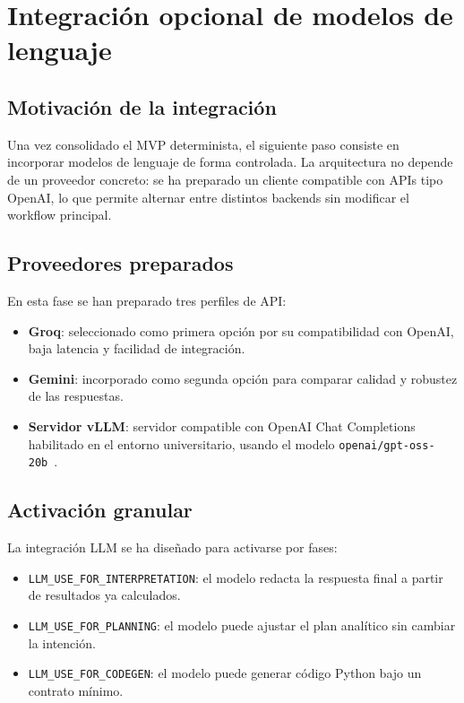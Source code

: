 \chapter{Integración opcional de modelos de lenguaje}

\section{Motivación de la integración}

Una vez consolidado el MVP determinista, el siguiente paso consiste en incorporar modelos de lenguaje de forma controlada. La arquitectura no depende de un proveedor concreto: se ha preparado un cliente compatible con APIs tipo OpenAI, lo que permite alternar entre distintos backends sin modificar el workflow principal.

\section{Proveedores preparados}

En esta fase se han preparado tres perfiles de API:

\begin{itemize}
    \item \textbf{Groq}: seleccionado como primera opción por su compatibilidad con OpenAI, baja latencia y facilidad de integración.
    \item \textbf{Gemini}: incorporado como segunda opción para comparar calidad y robustez de las respuestas.
    \item \textbf{Servidor vLLM}: servidor compatible con OpenAI Chat Completions habilitado en el entorno universitario, usando el modelo \texttt{openai/gpt-oss-20b}~\cite{openai2025gptossmodelcard}.
\end{itemize}

\section{Activación granular}

La integración LLM se ha diseñado para activarse por fases:

\begin{itemize}
    \item \texttt{LLM\_USE\_FOR\_INTERPRETATION}: el modelo redacta la respuesta final a partir de resultados ya calculados.
    \item \texttt{LLM\_USE\_FOR\_PLANNING}: el modelo puede ajustar el plan analítico sin cambiar la intención.
    \item \texttt{LLM\_USE\_FOR\_CODEGEN}: el modelo puede generar código Python bajo un contrato mínimo.
\end{itemize}

